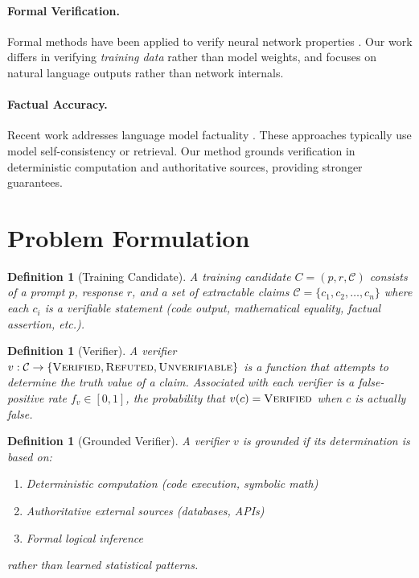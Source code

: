\documentclass[11pt,a4paper]{article}
\newtheorem{definition}[theorem]{Definition}
\newcommand{\calC}{\mathcal{C}}
\begin{document}
\paragraph{Formal Verification.}
Formal methods have been applied to verify neural network properties \citep{katz2017reluplex,huang2017safety}. Our work differs in verifying \emph{training data} rather than model weights, and focuses on natural language outputs rather than network internals.

\paragraph{Factual Accuracy.}
Recent work addresses language model factuality \citep{min2023factscore,manakul2023selfcheckgpt}. These approaches typically use model self-consistency or retrieval. Our method grounds verification in deterministic computation and authoritative sources, providing stronger guarantees.

\section{Problem Formulation}
\label{sec:problem}

\begin{definition}[Training Candidate]
A training candidate $C = (p, r, \calC)$ consists of a prompt $p$, response $r$, and a set of extractable claims $\calC = \{c_1, c_2, \ldots, c_n\}$ where each $c_i$ is a verifiable statement (code output, mathematical equality, factual assertion, etc.).
\end{definition}

\begin{definition}[Verifier]
A verifier $v: \calC \to \{\textsc{Verified}, \textsc{Refuted}, \textsc{Unverifiable}\}$ is a function that attempts to determine the truth value of a claim. Associated with each verifier is a \emph{false-positive rate} $f_v \in [0, 1]$, the probability that $v(c) = \textsc{Verified}$ when $c$ is actually false.
\end{definition}

\begin{definition}[Grounded Verifier]
A verifier $v$ is \emph{grounded} if its determination is based on:
\begin{enumerate}
    \item Deterministic computation (code execution, symbolic math)
    \item Authoritative external sources (databases, APIs)
    \item Formal logical inference
\end{enumerate}
rather than learned statistical patterns.
\end{definition}
\end{document}
